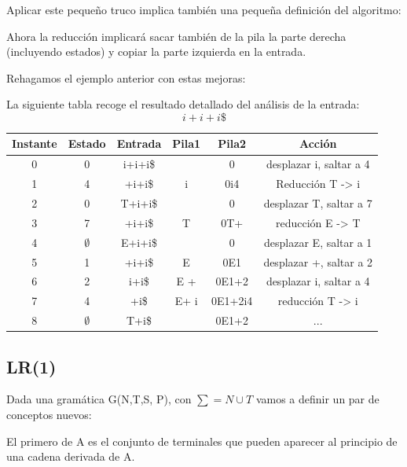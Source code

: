 \documentclass{apuntes}
\begin{document}
Aplicar este pequeño truco implica también una pequeña definición del algoritmo:

Ahora la reducción implicará sacar también de la pila la parte derecha (incluyendo estados) y copiar la parte izquierda en la entrada.

Rehagamos el ejemplo anterior con estas mejoras:
\begin{example}
La siguiente tabla recoge el resultado detallado del análisis de la entrada:
\[i+i+i\$\]
\begin{tabular}{| c | c | c | c | c | c |}
\hline
Instante & Estado  & Entrada & Pila1 & Pila2 & Acción \\
\hline
0 & 0 & i+i+i\$ & & 0 & desplazar i, saltar a 4\\
\hline
1 & 4 & +i+i\$ & i & 0i4 & Reducción T -> i \\
\hline
2 & 0 & T+i+i\$ & & 0& desplazar T, saltar a 7 \\
\hline
3 & 7 & +i+i\$ & T & 0T+ &reducción E -> T\\
\hline
4 & $\emptyset$ & E+i+i\$ & & 0 &desplazar E, saltar a 1 \\
\hline
5 & 1 & +i+i\$ & E & 0E1 & desplazar +, saltar a 2\\
\hline
6 & 2 & i+i\$ & E + & 0E1+2 & desplazar i, saltar a 4\\
\hline
7 & 4 & +i\$ & E+ i & 0E1+2i4 & reducción T -> i \\
\hline
8 & $\emptyset$ & T+i\$ & & 0E1+2 & ... \\
\hline
\end{tabular}
\end{example}

\newpage
\subsection{LR(1)}
Dada una gramática G(N,T,S, P), con $\sum = N \cup T$ vamos a definir un par de conceptos nuevos:

\begin{defn}[Primero]
El primero de A es el conjunto de terminales que pueden aparecer al principio de una cadena derivada de A.
\end{defn}
\end{document}
